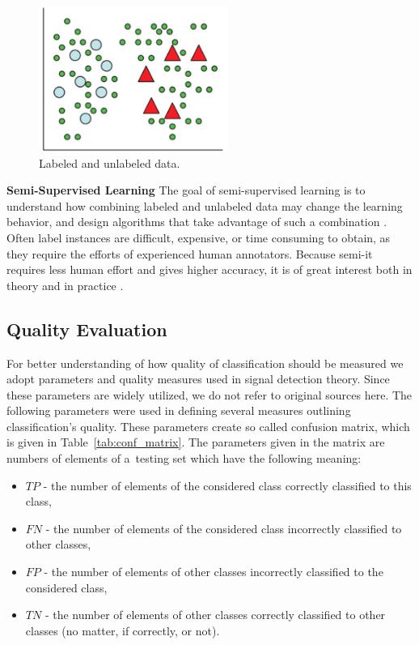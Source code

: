 \documentclass{mini}
\begin{document}
\begin{figure}
  \begin{center}
    \includegraphics[width=0.55\textwidth]{images/semi_supervised_graph.png}
  \end{center}
  \caption{Labeled and unlabeled data.}
  \label{fig:handwritten_ex}
\end{figure}

\textbf{Semi-Supervised Learning} The goal of semi-supervised learning is to understand how combining labeled and unlabeled data may change the learning behavior, and design algorithms that take advantage of such a combination \cite{semi_supervised}. Often label instances are difficult, expensive, or time consuming to obtain, as they require the efforts of experienced human annotators. Because semi-it requires less human effort and gives higher accuracy, it is of great interest both in theory and in practice \cite{semi_supervised2}.


\pagebreak
\paragraph{}
\subsection{Quality Evaluation}\label{evaluation}
For better understanding of how quality of classification should be measured we adopt parameters and quality measures used in signal detection theory. Since these parameters are widely utilized, we do not refer to original sources here. The following parameters were used in defining several measures outlining classification's quality. These parameters create so called confusion matrix, which is given in Table~\ref{tab:conf_matrix}. The parameters given in the matrix are numbers of elements of a~testing set which have the following meaning:
\begin{itemize}
  \item $TP$ - the number of elements of the considered class correctly classified to this class,
  \item $FN$ - the number of elements of the considered class incorrectly classified to other classes,  
  \item $FP$ - the number of elements of other classes incorrectly classified to the considered class,  
  \item $TN$ - the number of elements of other classes correctly classified to other classes (no matter, if correctly, or not).  
\end{itemize}  
\end{document}

